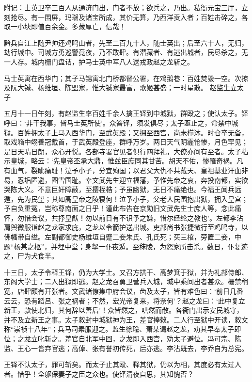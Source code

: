 \documentclass[]{article}
\begin{document}
附记：士英卫卒三百人从通济门出，门者不放；欲兵之，乃出。私衙元宝三厅，立刻抢尽。有一围屏，玛瑙及诸宝所成，其价无算，乃西洋贡入者；百姓击碎之，各取一小块即值百余金。多藏厚亡，信哉！

黔兵自江上随尹帅还鸡鸣山者，先至二百九十人，随士英出；后至六十人，无归，劫行城中。司城方勇巡警竟夜，乃不敢肆。有潜藏者、有逃出城者，民尽杀之，无一人存。城内栅门盘诘，护马士英中军八人送戎政赵之龙斩之。

马士英寓在西华门；其子马锡寓北门桥都督公署，在鸡鹅巷：百姓焚毁一空。次掠及阮大铖、杨维垣、陈盟家，惟大铖家最富，歌姬甚盛；一时星散。
赵监生立太子

五月十一日午刻，有赵监生率百姓千余人擒王铎到中城狱，群殴之；使认太子。铎呼曰：`非干我事，皆马士英所使'。众笞铎，须发俱尽；太子亟止之，命禁中城狱。百姓拥太子上马入西华门，至武英殿；又拥至西宫，尚未栉沐。时仓卒无备，取戏箱中翊善冠戴首，于武英殿登座，群呼万岁。两日天气阴霾怆惨，月色罕见；是日天晴日朗，众心开悦。各部寺署官见者俱行四拜礼，大僚亦间有至者。太子粘示皇城，略云：`先皇帝丕承大鼎，惟兹臣庶同其甘苦。胡天不佑，惨罹奇祸。凡有血气，裂眦痛耻！泣予小子，分宜殉国；以君父大仇不共戴天、皇祖基业汗血非易，忍垢匿避，图雪国耻。幸文武先生迎立福藩，予惟先帝之哀，奔投南都，实欲哭陈大义。不意巨奸障蔽，至撄桎梏；予虽幽狱，无日不痛绝也。今福王闻兵远遁，先为民望；其如高皇帝之陵寝何！泣予小子，父老人民围抱出狱，拥入皇宫；予自负重冤，岂称尊南面之日乎！谨此布告在京勋旧文武先生士庶人等，念此痛怀，勿惜会议，共抒皇猷！勿以前日有不识予之嫌，惜尔经纶之教也'。左都李沾肩舆微服诣赵之龙家求庇，之龙以令箭护送出城。吏部尚书张捷微行至鸡鸣寺，以佛幡带自缢。左副都御史杨维垣自蹙二妾朱氏、孔氏死；买三棺，旁置二妾，中题``杨某之柩''，并埋中堂；身挈一仆夜遁。至秣陵，为怨家所击杀。数日，仆复迹之，尸为犬食半。

十三日，太子令释王铎，仍为大学士。又召方拱干、高梦箕于狱，并为礼部侍郎、东阁大学士；二人出狱即逃。赵之龙召勇卫营兵入城，城中乘间出者甚众。栅禁稍宽，店肆颇有开张者。文武诸僚集中府会议，齿及太子，皆有难色曰：`前日几番云云，恐有蹈吕、张之祸者；不然，宏光帝复来，将奈何'？赵之龙曰：`此中复立新王，款使北归，其何辞以善后'！众皆然之，哄然而散。各衙门出示安民城守，并不及立新王之事。太子敕封中城狱神为王，差官捧敕。二人行至狱中开读，敕文称``崇祯十八年''；兵马司素服迎之。监生徐瑜、萧某谒赵之龙，劝其早奉太子即位；之龙立叱斩之。差官自北军中回，之龙即入西宫，劝太子避位。冯可宗、陈监、王心一皆弃官逃；高倬、张有誉初传死，后亦逃。李沾既去，李乔自为总宪。

王铎不认太子，罪可斩矣。而太子止其殴、释其狱，仍以为相，其度必有太过人者。惜乎！全躯保妻子之臣之众也。使铎清夜自思，其知愧否？
\end{document}
